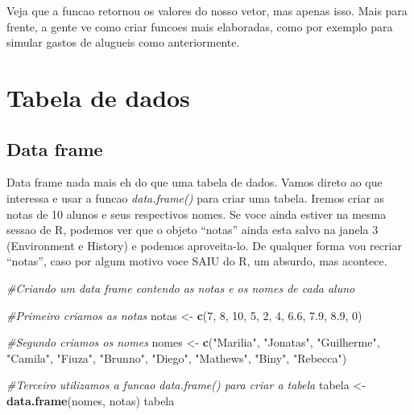 \documentclass[
]{book}
\newenvironment{Shaded}{\begin{snugshade}}{\end{snugshade}}
\newcommand{\CommentTok}[1]{\textcolor[rgb]{0.56,0.35,0.01}{\textit{#1}}}
\newcommand{\DecValTok}[1]{\textcolor[rgb]{0.00,0.00,0.81}{#1}}
\newcommand{\FloatTok}[1]{\textcolor[rgb]{0.00,0.00,0.81}{#1}}
\newcommand{\FunctionTok}[1]{\textcolor[rgb]{0.13,0.29,0.53}{\textbf{#1}}}
\newcommand{\NormalTok}[1]{#1}
\newcommand{\OtherTok}[1]{\textcolor[rgb]{0.56,0.35,0.01}{#1}}
\newcommand{\StringTok}[1]{\textcolor[rgb]{0.31,0.60,0.02}{#1}}
\begin{document}
Veja que a funcao retornou os valores do nosso vetor, mas apenas isso. Mais para frente, a gente ve como criar funcoes mais elaboradas, como por exemplo para simular gastos de alugueis como anteriormente.

\hypertarget{tabela-de-dados}{%
\section{Tabela de dados}\label{tabela-de-dados}}

\hypertarget{data-frame}{%
\subsection{Data frame}\label{data-frame}}

Data frame nada mais eh do que uma tabela de dados. Vamos direto ao que interessa e usar a funcao \emph{data.frame()} para criar uma tabela. Iremos criar as notas de 10 alunos e seus respectivos nomes. Se voce ainda estiver na mesma sessao de R, podemos ver que o objeto ``notas'' ainda esta salvo na janela 3 (Environment e History) e podemos aproveita-lo. De qualquer forma vou recriar ``notas'', caso por algum motivo voce SAIU do R, um absurdo, mas acontece.

\begin{Shaded}
\begin{Highlighting}[]
\CommentTok{\#Criando um data frame contendo as notas e os nomes de cada aluno}

\CommentTok{\#Primeiro criamos as notas}
\NormalTok{notas }\OtherTok{\textless{}{-}} \FunctionTok{c}\NormalTok{(}\DecValTok{7}\NormalTok{, }\DecValTok{8}\NormalTok{, }\DecValTok{10}\NormalTok{, }\DecValTok{5}\NormalTok{, }\DecValTok{2}\NormalTok{, }\DecValTok{4}\NormalTok{, }\FloatTok{6.6}\NormalTok{, }\FloatTok{7.9}\NormalTok{, }\FloatTok{8.9}\NormalTok{, }\DecValTok{0}\NormalTok{) }

\CommentTok{\#Segundo criamos os nomes}
\NormalTok{nomes }\OtherTok{\textless{}{-}} \FunctionTok{c}\NormalTok{(}\StringTok{"Marilia"}\NormalTok{, }\StringTok{"Jonatas"}\NormalTok{, }\StringTok{"Guilherme"}\NormalTok{, }\StringTok{"Camila"}\NormalTok{, }
\StringTok{"Fiuza"}\NormalTok{, }\StringTok{"Brunno"}\NormalTok{, }\StringTok{"Diego"}\NormalTok{, }\StringTok{"Mathews"}\NormalTok{, }\StringTok{"Biny"}\NormalTok{, }\StringTok{"Rebecca"}\NormalTok{)}

\CommentTok{\#Terceiro utilizamos a funcao data.frame() para criar a tabela}
\NormalTok{tabela }\OtherTok{\textless{}{-}} \FunctionTok{data.frame}\NormalTok{(nomes, notas)}
\NormalTok{tabela}
\end{Highlighting}
\end{Shaded}
\end{document}
